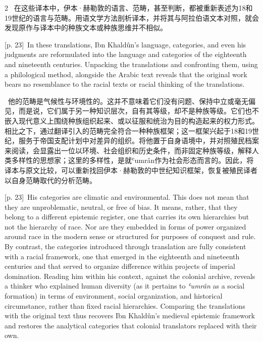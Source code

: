 \documentclass[10pt,a4paper]{article}
\begin{document}
\begin{paracol}{2}
\switchcolumn*
{\scriptsize\color{gray} [p. 23]}\ 在这些译本中，伊本·赫勒敦的语言、范畴，甚至判断，都被重新表述为18和19世纪的语言与范畴。用语文学方法剖析译本，并将其与阿拉伯语文本对照，就会发现原作与译本中的种族文本或种族思维并不相似。\par
\switchcolumn
{\scriptsize\color{gray} [p. 23]}\ In these translations, Ibn Khaldûn’s language, categories, and even his judgments are reformulated into the language and categories of the eighteenth and nineteenth centuries. Unpacking the translations and confronting them, using a philological method, alongside the Arabic text reveals that the original work bears no resemblance to the racial texts or racial thinking of the translations.\par
\switchcolumn*
{\scriptsize\color{gray} [p. 23]}\ 他的范畴是气候性与环境性的。这并不意味着它们没有问题、保持中立或毫无偏见，而是说，它们属于另一种知识层次，自有其等级，却不是种族等级。它们也不嵌入现代意义上围绕种族组织起来、或以征服和统治为目的构造起来的权力形式。相比之下，通过翻译引入的范畴完全符合一种种族框架；这一框架兴起于18和19世纪，服务于帝国支配计划中对差异的组织。将他置于自身语境中，并对照殖民档案来阅读，会显露出一位以环境、社会组织和历史条件，而非固定种族等级，解释人类多样性的思想家；这里的多样性，是就ʿumrân作为社会形态而言的。因此，将译本与原文比较，可以重新找回伊本·赫勒敦的中世纪知识框架，恢复被殖民译者以自身范畴取代的分析范畴。\par
\switchcolumn
{\scriptsize\color{gray} [p. 23]}\ His categories are climatic and environmental. This does not mean that they are unproblematic, neutral, or free of bias. It means, rather, that they belong to a different epistemic register, one that carries its own hierarchies but not the hierarchy of race. Nor are they embedded in forms of power organized around race in the modern sense or structured for purposes of conquest and rule. By contrast, the categories introduced through translation are fully consistent with a racial framework, one that emerged in the eighteenth and nineteenth centuries and that served to organize difference within projects of imperial domination. Reading him within his context, against the colonial archive, reveals a thinker who explained human diversity (as it pertains to \textit{ʿumrân} as a social formation) in terms of environment, social organization, and historical circumstance, rather than fixed racial hierarchies. Comparing the translations with the original text thus recovers Ibn Khaldûn’s medieval epistemic framework and restores the analytical categories that colonial translators replaced with their own.\par
\switchcolumn*
\end{paracol}
\end{document}
